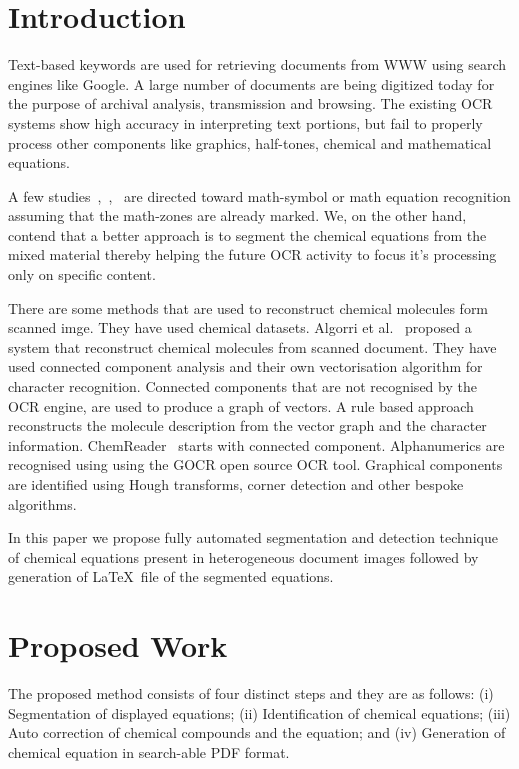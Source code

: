 \documentclass[conference]{IEEEtran}
\begin{document}

\section{Introduction}
Text-based keywords are used for retrieving  documents from  WWW using search 
engines like Google.
 A large number of documents are being digitized today for the purpose of archival analysis, transmission and browsing. The existing OCR systems show high accuracy in interpreting text portions, but fail to properly process other components like graphics, half-tones, chemical and mathematical equations.

A few studies~\cite{blostein_97},~\cite{chan_00},~\cite{Garain_07} are directed toward math-symbol or math equation recognition
assuming that the math-zones are already marked. We, on the other hand, contend that a better approach is to segment the chemical equations from the mixed material thereby helping the future OCR activity to focus it’s processing only on specific
content. 

There are some methods that are used to reconstruct chemical molecules form scanned imge. They have used chemical datasets. Algorri et al.~\cite{algorri_07, algorri_07a} proposed a system that reconstruct chemical molecules from scanned document. They have used connected component analysis and their own vectorisation algorithm for character recognition. Connected components that are not recognised by the OCR engine, are used to produce a graph of vectors. A rule based approach reconstructs the molecule description from the vector graph and the character information. 
ChemReader~\cite{park_09} starts with connected component. Alphanumerics are  recognised using using the GOCR open source OCR tool. Graphical components are  identified using Hough transforms, corner detection and other bespoke algorithms.

In this paper we propose fully automated segmentation and detection technique of chemical equations present in
heterogeneous document images followed by generation of \LaTeX\ file of the segmented equations.


\section{Proposed Work} 
\label{proposed_algo}
The proposed
method consists of four distinct steps and they are as follows: (i) Segmentation of displayed equations; (ii) Identification of
chemical equations; (iii) Auto correction of chemical compounds and the equation; and (iv) Generation of chemical equation in search-able PDF format.
 
\end{document}
